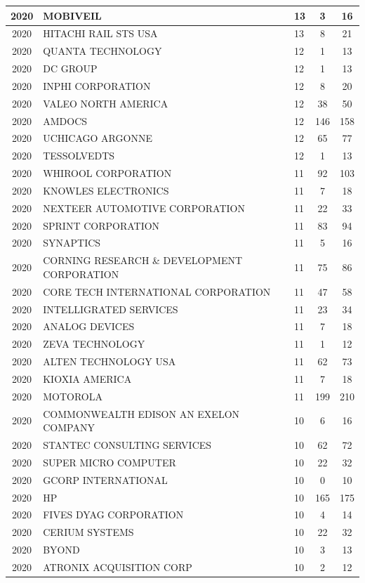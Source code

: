 \documentclass{article}%
\begin{document}
\begin{longtable}{c|p{20em}|p{5em}|c|c}
\hline%
2020&MOBIVEIL&13&3&16\\%
\hline%
2020&HITACHI RAIL STS USA&13&8&21\\%
\hline%
2020&QUANTA TECHNOLOGY&12&1&13\\%
\hline%
2020&DC GROUP&12&1&13\\%
\hline%
2020&INPHI CORPORATION&12&8&20\\%
\hline%
2020&VALEO NORTH AMERICA&12&38&50\\%
\hline%
2020&AMDOCS&12&146&158\\%
\hline%
2020&UCHICAGO ARGONNE&12&65&77\\%
\hline%
2020&TESSOLVEDTS&12&1&13\\%
\hline%
2020&WHIROOL CORPORATION&11&92&103\\%
\hline%
2020&KNOWLES ELECTRONICS&11&7&18\\%
\hline%
2020&NEXTEER AUTOMOTIVE CORPORATION&11&22&33\\%
\hline%
2020&SPRINT CORPORATION&11&83&94\\%
\hline%
2020&SYNAPTICS&11&5&16\\%
\hline%
2020&CORNING RESEARCH \& DEVELOPMENT CORPORATION&11&75&86\\%
\hline%
2020&CORE TECH INTERNATIONAL CORPORATION&11&47&58\\%
\hline%
2020&INTELLIGRATED SERVICES&11&23&34\\%
\hline%
2020&ANALOG DEVICES&11&7&18\\%
\hline%
2020&ZEVA TECHNOLOGY&11&1&12\\%
\hline%
2020&ALTEN TECHNOLOGY USA&11&62&73\\%
\hline%
2020&KIOXIA AMERICA&11&7&18\\%
\hline%
2020&MOTOROLA&11&199&210\\%
\hline%
2020&COMMONWEALTH EDISON AN EXELON COMPANY&10&6&16\\%
\hline%
2020&STANTEC CONSULTING SERVICES&10&62&72\\%
\hline%
2020&SUPER MICRO COMPUTER&10&22&32\\%
\hline%
2020&GCORP INTERNATIONAL&10&0&10\\%
\hline%
2020&HP&10&165&175\\%
\hline%
2020&FIVES DYAG CORPORATION&10&4&14\\%
\hline%
2020&CERIUM SYSTEMS&10&22&32\\%
\hline%
2020&BYOND&10&3&13\\%
\hline%
2020&ATRONIX ACQUISITION CORP&10&2&12\\%
\hline%

\end{longtable}
\end{document}
